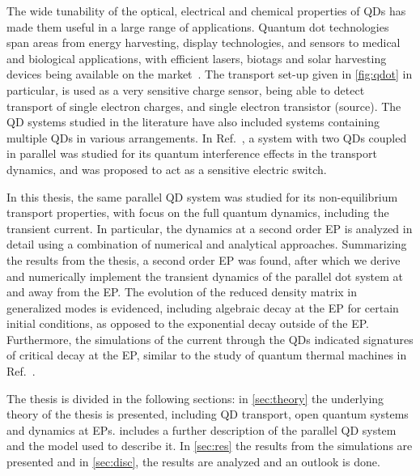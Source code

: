\documentclass[../main.tex]{subfiles}
\begin{document}
The wide tunability of the optical, electrical and chemical properties of QDs has made them useful in a large range of applications. Quantum dot technologies span areas from energy harvesting, display technologies, and sensors to medical and biological applications, with efficient lasers, biotags and solar harvesting devices being available on the market~\cite{qdotrev}. The transport set-up given in \cref{fig:qdot} in particular, is used as a very sensitive charge sensor, being able to detect transport of single electron charges, and single electron transistor (source). The QD systems studied in the literature have also included systems containing multiple QDs in various arrangements. In Ref.~\cite{doubledot}, a system with two QDs coupled in parallel was studied for its quantum interference effects in the transport dynamics, and was proposed to act as a sensitive electric switch.

In this thesis, the same parallel QD system was studied for its non-equilibrium transport properties, with focus on the full quantum dynamics, including the transient current. In particular, the dynamics at a second order EP is analyzed in detail using a combination of numerical and analytical approaches. Summarizing the results from the thesis, a second order EP was found, after which we derive and numerically implement the transient dynamics of the parallel dot system at and away from the EP. The evolution of the reduced density matrix in generalized modes is evidenced, including algebraic decay at the EP for certain initial conditions, as opposed to the exponential decay outside of the EP. Furthermore, the simulations of the current through the QDs indicated signatures of critical decay at the EP, similar to the study of quantum thermal machines in Ref.~\cite{thermal}.



The thesis is divided in the following sections: in \cref{sec:theory} the underlying theory of the thesis is presented, including QD transport, open quantum systems and dynamics at EPs.  includes a further description of the parallel QD system and the model used to describe it. In \cref{sec:res} the results from the simulations are presented and in \cref{sec:disc}, the results are analyzed and an outlook is done.
\end{document}
